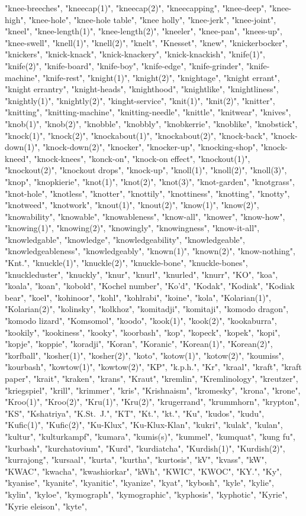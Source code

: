 "knee-breeches",
"kneecap(1)",
"kneecap(2)",
"kneecapping",
"knee-deep",
"knee-high",
"knee-hole",
"knee-hole table",
"knee holly",
"knee-jerk",
"knee-joint",
"kneel",
"knee-length(1)",
"knee-length(2)",
"kneeler",
"knee-pan",
"knees-up",
"knee-swell",
"knell(1)",
"knell(2)",
"knelt",
"Knesset",
"knew",
"knickerbocker",
"knickers",
"knick-knack",
"knick-knackery",
"knick-knackish",
"knife(1)",
"knife(2)",
"knife-board",
"knife-boy",
"knife-edge",
"knife-grinder",
"knife-machine",
"knife-rest",
"knight(1)",
"knight(2)",
"knightage",
"knight errant",
"knight errantry",
"knight-heads",
"knighthood",
"knightlike",
"knightliness",
"knightly(1)",
"knightly(2)",
"kinght-service",
"knit(1)",
"knit(2)",
"knitter",
"knitting",
"knitting-machine",
"knitting-needle",
"knittle",
"knitwear",
"knives",
"knob(1)",
"knob(2)",
"knobble",
"knobbly",
"knobkerrie",
"knoblike",
"knobstick",
"knock(1)",
"knock(2)",
"knockabout(1)",
"knockabout(2)",
"knock-back",
"knock-down(1)",
"knock-down(2)",
"knocker",
"knocker-up",
"knocking-shop",
"knock-kneed",
"knock-knees",
"konck-on",
"knock-on effect",
"knockout(1)",
"knockout(2)",
"knockout drops",
"knock-up",
"knoll(1)",
"knoll(2)",
"knoll(3)",
"knop",
"knopkierie",
"knot(1)",
"knot(2)",
"knot(3)",
"knot-garden",
"knotgrass",
"knot-hole",
"knotless",
"knotter",
"knottily",
"knottiness",
"knotting",
"knotty",
"knotweed",
"knotwork",
"knout(1)",
"knout(2)",
"know(1)",
"know(2)",
"knowability",
"knowable",
"knowableness",
"know-all",
"knower",
"know-how",
"knowing(1)",
"knowing(2)",
"knowingly",
"knowingness",
"know-it-all",
"knowledgable",
"knowledge",
"knowledgeability",
"knowledgeable",
"knowledgeableness",
"knowledgeably",
"known(1)",
"known(2)",
"know-nothing",
"Knt.",
"knuckle(1)",
"knuckle(2)",
"knuckle-bone",
"knuckle-bones",
"knuckleduster",
"knuckly",
"knur",
"knurl",
"knurled",
"knurr",
"KO",
"koa",
"koala",
"koan",
"kobold",
"Kochel number",
"Ko'd",
"Kodak",
"Kodiak",
"Kodiak bear",
"koel",
"kohinoor",
"kohl",
"kohlrabi",
"koine",
"kola",
"Kolarian(1)",
"Kolarian(2)",
"kolinsky",
"kolkhoz",
"komitadji",
"komitaji",
"komodo dragon",
"komodo lizard",
"Komsomol",
"koodo",
"kook(1)",
"kook(2)",
"kookaburra",
"kookily",
"kookiness",
"kooky",
"koorbash",
"kop",
"kopeck",
"kopek",
"kopi",
"kopje",
"koppie",
"koradji",
"Koran",
"Koranic",
"Korean(1)",
"Korean(2)",
"korfball",
"kosher(1)",
"kosher(2)",
"koto",
"kotow(1)",
"kotow(2)",
"koumiss",
"kourbash",
"kowtow(1)",
"kowtow(2)",
"KP",
"k.p.h.",
"Kr",
"kraal",
"kraft",
"kraft paper",
"krait",
"kraken",
"krans",
"Kraut",
"kremlin",
"Kremlinology",
"kreutzer",
"kriegspiel",
"krill",
"krimmer",
"kris",
"Krishnaism",
"kromesky",
"krona",
"krone",
"Kroo(1)",
"Kroo(2)",
"Kru(1)",
"Kru(2)",
"krugerrand",
"krummhorn",
"krypton",
"KS",
"Kshatriya",
"K.St.\ J.",
"KT",
"Kt.",
"kt.",
"Ku",
"kudos",
"kudu",
"Kufic(1)",
"Kufic(2)",
"Ku-Klux",
"Ku-Klux-Klan",
"kukri",
"kulak",
"kulan",
"kultur",
"kulturkampf",
"kumara",
"kumis(s)",
"kummel",
"kumquat",
"kung fu",
"kurbash",
"kurchatovium",
"Kurd",
"kurdiatcha",
"Kurdish(1)",
"Kurdish(2)",
"kurrajong",
"kursaal",
"kurta",
"kurtha",
"kurtosis",
"kV",
"kvass",
"kW",
"KWAC",
"kwacha",
"kwashiorkar",
"kWh",
"KWIC",
"KWOC",
"KY.",
"Ky",
"kyanise",
"kyanite",
"kyanitic",
"kyanize",
"kyat",
"kybosh",
"kyle",
"kylie",
"kylin",
"kyloe",
"kymograph",
"kymographic",
"kyphosis",
"kyphotic",
"Kyrie",
"Kyrie eleison",
"kyte",
